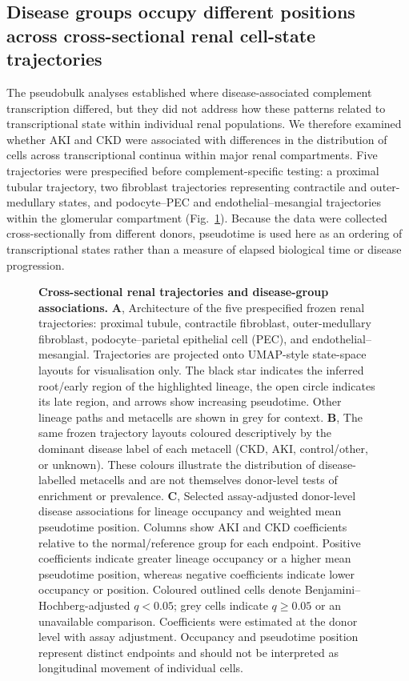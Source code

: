 \documentclass[10pt,letterpaper]{article}
\begin{document}
\subsection*{Disease groups occupy different positions across cross-sectional renal cell-state trajectories}

The pseudobulk analyses established where disease-associated complement transcription differed, but they did not address how these patterns related to transcriptional state within individual renal populations. We therefore examined whether AKI and CKD were associated with differences in the distribution of cells across transcriptional continua within major renal compartments. Five trajectories were prespecified before complement-specific testing: a proximal tubular trajectory, two fibroblast trajectories representing contractile and outer-medullary states, and podocyte--PEC and endothelial--mesangial trajectories within the glomerular compartment (Fig.~\ref{fig:trajectory_disease}). Because the data were collected cross-sectionally from different donors, pseudotime is used here as an ordering of transcriptional states rather than a measure of elapsed biological time or disease progression.

\begin{figure}[!h]
\caption{\textbf{Cross-sectional renal trajectories and disease-group associations.}
\textbf{A}, Architecture of the five prespecified frozen renal trajectories: proximal tubule, contractile fibroblast, outer-medullary fibroblast, podocyte--parietal epithelial cell (PEC), and endothelial--mesangial. Trajectories are projected onto UMAP-style state-space layouts for visualisation only. The black star indicates the inferred root/early region of the highlighted lineage, the open circle indicates its late region, and arrows show increasing pseudotime. Other lineage paths and metacells are shown in grey for context. \textbf{B}, The same frozen trajectory layouts coloured descriptively by the dominant disease label of each metacell (CKD, AKI, control/other, or unknown). These colours illustrate the distribution of disease-labelled metacells and are not themselves donor-level tests of enrichment or prevalence. \textbf{C}, Selected assay-adjusted donor-level disease associations for lineage occupancy and weighted mean pseudotime position. Columns show AKI and CKD coefficients relative to the normal/reference group for each endpoint. Positive coefficients indicate greater lineage occupancy or a higher mean pseudotime position, whereas negative coefficients indicate lower occupancy or position. Coloured outlined cells denote Benjamini--Hochberg-adjusted $q<0.05$; grey cells indicate $q\geq0.05$ or an unavailable comparison. Coefficients were estimated at the donor level with assay adjustment. Occupancy and pseudotime position represent distinct endpoints and should not be interpreted as longitudinal movement of individual cells.}
\label{fig:trajectory_disease}
\end{figure}
\end{document}
